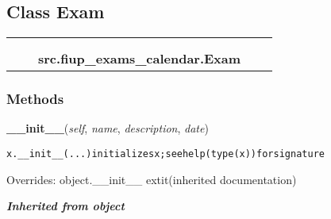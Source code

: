
\subsection{Class Exam}

    \label{src:fiup_exams_calendar:Exam}
\begin{tabular}{cccccc}
\multicolumn{2}{r}{\settowidth{\BCL}{object}\multirow{2}{\BCL}{object}}
&&
  \\\cline{3-3}
  &&\multicolumn{1}{c|}{}
&&
  \\
&&\multicolumn{2}{l}{\textbf{src.fiup\_exams\_calendar.Exam}}
\end{tabular}



  \subsubsection{Methods}

    \vspace{0.5ex}

\hspace{.8\funcindent}\begin{boxedminipage}{\funcwidth}

    \raggedright \textbf{\_\_init\_\_}(\textit{self}, \textit{name}, \textit{description}, \textit{date})

\setlength{\parskip}{2ex}
\begin{alltt}
x.\_\_init\_\_(...) initializes x; see help(type(x)) for signature
\end{alltt}

\setlength{\parskip}{1ex}
      Overrides: object.\_\_init\_\_ 	extit{(inherited documentation)}

    \end{boxedminipage}


\large{\textbf{\textit{Inherited from object}}}

